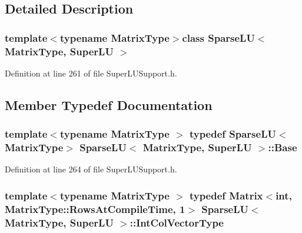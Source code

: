 \subsection{Detailed Description}
\subsubsection*{template$<$typename Matrix\-Type$>$class Sparse\-L\-U$<$ Matrix\-Type, Super\-L\-U $>$}



Definition at line 261 of file Super\-L\-U\-Support.\-h.



\subsection{Member Typedef Documentation}
\hypertarget{class_sparse_l_u_3_01_matrix_type_00_01_super_l_u_01_4_ac408a79e1a4e8fb823d8ec9bb9d1bded}{
\subsubsection[{Base}]{\setlength{\rightskip}{0pt plus 5cm}template$<$typename Matrix\-Type $>$ typedef {\bf Sparse\-L\-U}$<$Matrix\-Type$>$ {\bf Sparse\-L\-U}$<$ Matrix\-Type, {\bf Super\-L\-U} $>$\-::{\bf Base}\hspace{0.3cm}{\ttfamily [protected]}}}\label{class_sparse_l_u_3_01_matrix_type_00_01_super_l_u_01_4_ac408a79e1a4e8fb823d8ec9bb9d1bded}


Definition at line 264 of file Super\-L\-U\-Support.\-h.

\hypertarget{class_sparse_l_u_3_01_matrix_type_00_01_super_l_u_01_4_a904f8c9f7dcd198fcc6fd897cec1ac8e}{
\subsubsection[{Int\-Col\-Vector\-Type}]{\setlength{\rightskip}{0pt plus 5cm}template$<$typename Matrix\-Type $>$ typedef {\bf Matrix}$<${\bf int}, Matrix\-Type\-::\-Rows\-At\-Compile\-Time, 1$>$ {\bf Sparse\-L\-U}$<$ Matrix\-Type, {\bf Super\-L\-U} $>$\-::{\bf Int\-Col\-Vector\-Type}\hspace{0.3cm}{\ttfamily [protected]}}}\label{class_sparse_l_u_3_01_matrix_type_00_01_super_l_u_01_4_a904f8c9f7dcd198fcc6fd897cec1ac8e}


